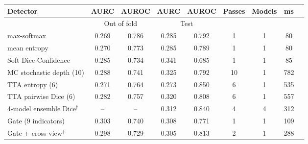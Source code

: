\begin{tabular}{lcccccccc}
\hline
Detector & AURC & AUROC & AURC & AUROC & Passes & Models & ms \\
\hline
 & \multicolumn{2}{c}{Out of fold} & \multicolumn{2}{c}{Test} &  &  &  \\
max-softmax & 0.269 & 0.786 & 0.285 & 0.792 & 1 & 1 & 80 \\
mean entropy & 0.270 & 0.773 & 0.285 & 0.789 & 1 & 1 & 80 \\
Soft Dice Confidence & 0.285 & 0.734 & 0.341 & 0.685 & 1 & 1 & 85 \\
MC stochastic depth (10) & 0.288 & 0.741 & 0.325 & 0.792 & 10 & 1 & 782 \\
TTA entropy (6) & 0.271 & 0.764 & 0.273 & 0.850 & 6 & 1 & 535 \\
TTA pairwise Dice (6) & 0.282 & 0.757 & 0.320 & 0.808 & 6 & 1 & 557 \\
4-model ensemble Dice$^{\dagger}$ & -- & -- & 0.312 & 0.840 & 4 & 4 & 312 \\
Gate (9 indicators) & 0.303 & 0.740 & 0.308 & 0.771 & 1 & 1 & 109 \\
Gate + cross-view$^{\ddagger}$ & 0.298 & 0.729 & 0.305 & 0.813 & 2 & 1 & 288 \\
\hline
\end{tabular}
